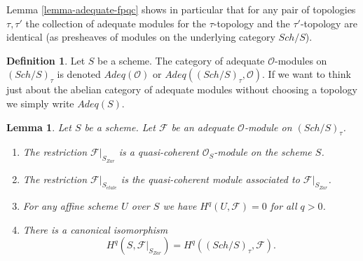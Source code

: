 \documentclass{stacks-project}
\theoremstyle{plain}
\newtheorem{lemma}[subsection]{Lemma}
\theoremstyle{definition}
\newtheorem{definition}[subsection]{Definition}
\theoremstyle{remark}
\numberwithin{equation}{subsection}
\def\Sch{\mathit{Sch}}
\def\etale{{\acute{e}tale}}
\begin{document}
\noindent
Lemma \ref{lemma-adequate-fpqc} shows in particular that
for any pair of topologies $\tau, \tau'$ the collection
of adequate modules for the $\tau$-topology and the $\tau'$-topology
are identical (as presheaves of modules on the underlying category $\Sch/S$).

\begin{definition}
\label{definition-category-adequate-modules}
Let $S$ be a scheme. The category of adequate $\mathcal{O}$-modules on
$(\Sch/S)_\tau$ is denoted {\it $\textit{Adeq}(\mathcal{O})$} or
{\it $\textit{Adeq}((\Sch/S)_\tau, \mathcal{O})$}. If we want to think just
about the abelian category of adequate modules without choosing a
topology we simply write {\it $\textit{Adeq}(S)$}.
\end{definition}

\begin{lemma}
\label{lemma-same-cohomology-adequate}
Let $S$ be a scheme. Let $\mathcal{F}$ be an adequate
$\mathcal{O}$-module on $(\Sch/S)_\tau$.
\begin{enumerate}
\item The restriction $\mathcal{F}|_{S_{Zar}}$ is a quasi-coherent
$\mathcal{O}_S$-module on the scheme $S$.
\item The restriction $\mathcal{F}|_{S_\etale}$ is the
quasi-coherent module associated to $\mathcal{F}|_{S_{Zar}}$.
\item For any affine scheme $U$ over $S$ we have $H^q(U, \mathcal{F}) = 0$
for all $q > 0$.
\item There is a canonical isomorphism
$$
H^q(S, \mathcal{F}|_{S_{Zar}}) =
H^q((\Sch/S)_\tau, \mathcal{F}).
$$
\end{enumerate}
\end{lemma}
\end{document}

